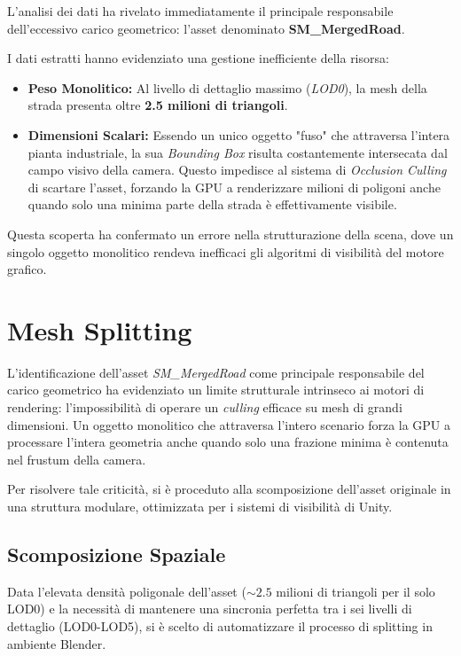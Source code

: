 L'analisi dei dati ha rivelato immediatamente il principale responsabile dell'eccessivo carico geometrico: l'asset denominato \textbf{SM\_MergedRoad}. 

I dati estratti hanno evidenziato una gestione inefficiente della risorsa:
\begin{itemize}
    \item \textbf{Peso Monolitico:} Al livello di dettaglio massimo (\textit{LOD0}), la mesh della strada presenta oltre \textbf{2.5 milioni di triangoli}.
    \item \textbf{Dimensioni Scalari:} Essendo un unico oggetto "fuso" che attraversa l'intera pianta industriale, la sua \textit{Bounding Box} risulta costantemente intersecata dal campo visivo della camera. Questo impedisce al sistema di \textit{Occlusion Culling} di scartare l'asset, forzando la GPU a renderizzare milioni di poligoni anche quando solo una minima parte della strada è effettivamente visibile.
\end{itemize}

Questa scoperta ha confermato un errore nella strutturazione della scena, dove un singolo oggetto monolitico rendeva inefficaci gli algoritmi di visibilità del motore grafico.

\section{Mesh Splitting}

L'identificazione dell'asset \textit{SM\_MergedRoad} come principale responsabile del carico geometrico ha evidenziato un limite strutturale intrinseco ai motori di rendering: l'impossibilità di operare un \textit{culling} efficace su mesh di grandi dimensioni. Un oggetto monolitico che attraversa l'intero scenario forza la GPU a processare l'intera geometria anche quando solo una frazione minima è contenuta nel frustum della camera. 

Per risolvere tale criticità, si è proceduto alla scomposizione dell'asset originale in una struttura modulare, ottimizzata per i sistemi di visibilità di Unity.

\subsection{Scomposizione Spaziale}

Data l'elevata densità poligonale dell'asset ($\sim 2.5$ milioni di triangoli per il solo LOD0) e la necessità di mantenere una sincronia perfetta tra i sei livelli di dettaglio (LOD0-LOD5), si è scelto di automatizzare il processo di splitting in ambiente Blender.

